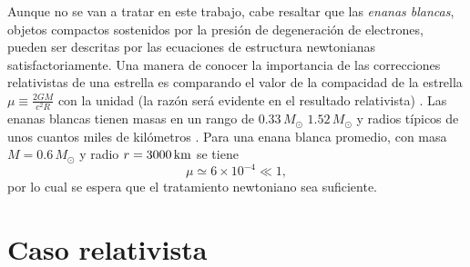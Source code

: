 
 Aunque no se van a tratar en este trabajo, cabe resaltar que las \emph{enanas blancas}, objetos compactos sostenidos por la presión de degeneración de electrones, pueden ser descritas por las ecuaciones de estructura newtonianas satisfactoriamente. Una manera de conocer la importancia de las correcciones relativistas de una estrella es comparando el valor de la compacidad de la estrella $\mu \equiv \frac{2GM}{c^2R}$ con la unidad (la razón será evidente en el resultado relativista) \cite{Weinberg1972}. Las enanas blancas tienen masas en un rango de $0.33\,M_{\odot}$ $1.52\,M_{\odot}$ y radios típicos de unos cuantos miles de kilómetros \cite{Glendenning2000}. Para una enana blanca promedio, con masa $M=0.6\,M_{\odot}$ y radio $r=3000 \,\rm{km}$ se tiene
\begin{equation}
    \mu \simeq 6\times 10^{-4}\ll 1,
\end{equation}
por lo cual se espera que el tratamiento newtoniano sea suficiente. 

\section{Caso relativista}\label{CR}


